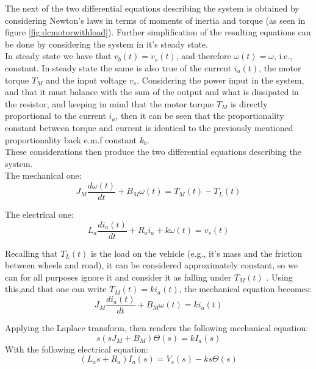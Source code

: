 \documentclass[a4paper,onecolumn,amsmath,amssymb]{revtex4-1}
\begin{document}
The next of the two differential equations describing the system is obtained by considering Newton's laws in terms of moments of inertia and torque (as seen in figure \ref{fig:dcmotorwithload}). Further simplification of the resulting equations can be done by considering the system in it's steady state.\\

In steady state we have that $v_b (t) =v_s (t)$, and therefore $\omega (t)=\omega$, i.e., constant. In steady state the same is also true of the current $i_a (t)$, the motor torque $T_M $ and the input voltage $v_s$. Considering the power input in the system, and that it must balance with the sum of the output and what is dissipated  in the resistor, and keeping in mind that the motor torque $T_M$ is directly proportional to the current $i_a$, then it can be seen that the proportionality constant between torque and current is identical to the previously mentioned proportionality back e.m.f constant $k_b$.\\

These considerations then produce the two differential equations describing the system.\\

The mechanical one:\\

\begin{equation}
J_M\frac{d\omega(t)}{dt}+B_M\omega(t)=T_M (t)-T_L (t)
\end{equation}

The electrical one:\\

\begin{equation}
L_a\frac{d i_a (t)}{dt}+R_a i_a+k\omega (t)=v_s (t)
\end{equation}

Recalling that $T_L(t)$ is the load on the vehicle (e.g., it's mass and the friction between wheels and road), it can be considered approximately constant, so we can for all purposes ignore it and consider it as falling under $T_M(t)$ . Using this,and that one can write $T_M(t)=k i_a(t)$, the mechanical equation becomes:\\

\begin{equation}
J_M\frac{d i_a(t)}{dt}+B_M\omega(t) =k i_a (t)
\end{equation}

Applying the Laplace transform, then renders the following mechanical equation:\\
\begin{equation}
 s \left( s J_M + B_M\right)\Theta (s)=k I_a(s)
\end{equation}
With the following electrical equation:\\
\begin{equation}
\left( L_a s+R_a\right)I_a(s)=V_s(s) - k s \Theta(s)
\end{equation}
\end{document}
